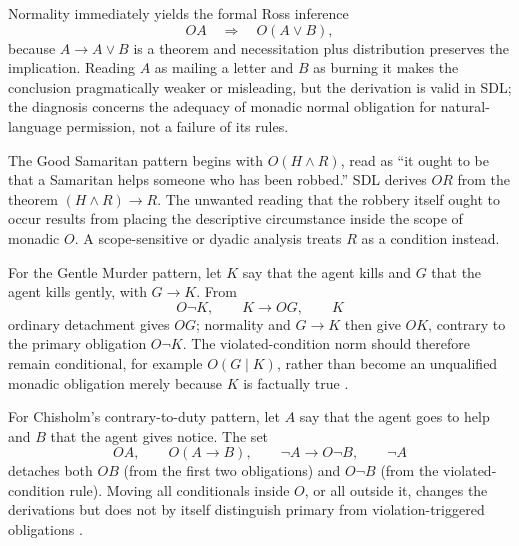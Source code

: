 Normality immediately yields the formal Ross inference
\[
 OA\quad\Longrightarrow\quad O(A\lor B),
\]
because \(A\to A\lor B\) is a theorem and necessitation plus distribution
preserves the implication.  Reading \(A\) as mailing a letter and \(B\) as
burning it makes the conclusion pragmatically weaker or misleading, but the
derivation is valid in SDL; the diagnosis concerns the adequacy of monadic
normal obligation for natural-language permission, not a failure of its rules.

The Good Samaritan pattern begins with \(O(H\land R)\), read as ``it ought to
be that a Samaritan helps someone who has been robbed.''  SDL derives \(OR\)
from the theorem \((H\land R)\to R\).  The unwanted reading that the robbery
itself ought to occur results from placing the descriptive circumstance inside
the scope of monadic \(O\).  A scope-sensitive or dyadic analysis treats
\(R\) as a condition instead.

For the Gentle Murder pattern, let \(K\) say that the agent kills and \(G\)
that the agent kills gently, with \(G\to K\).  From
\[
 O\neg K,\qquad K\to OG,\qquad K
\]
ordinary detachment gives \(OG\); normality and \(G\to K\) then give \(OK\),
contrary to the primary obligation \(O\neg K\).  The violated-condition norm
should therefore remain conditional, for example \(O(G\mid K)\), rather than
become an unqualified monadic obligation merely because \(K\) is factually
true \cite{Forrester1984}.

For Chisholm's contrary-to-duty pattern, let \(A\) say that the agent goes to
help and \(B\) that the agent gives notice.  The set
\[
 OA,\qquad O(A\to B),\qquad \neg A\to O\neg B,\qquad \neg A
\]
detaches both \(OB\) (from the first two obligations) and \(O\neg B\) (from
the violated-condition rule).  Moving all conditionals inside \(O\), or all
outside it, changes the derivations but does not by itself distinguish primary
from violation-triggered obligations \cite{Chisholm1963,McNamara2006}.

